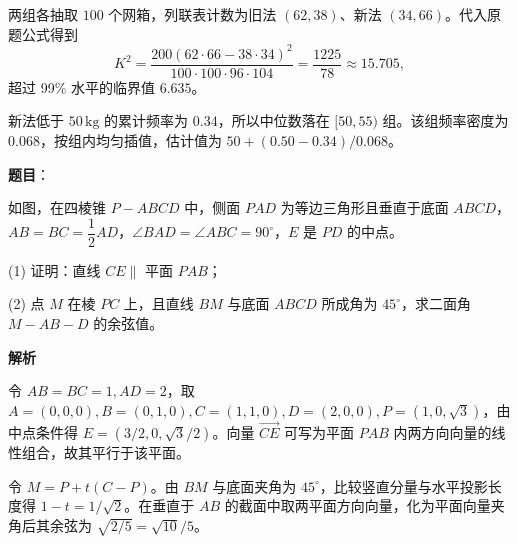 \begin{answer}
两组各抽取 \(100\) 个网箱，列联表计数为旧法 \((62,38)\)、新法 \((34,66)\)。代入原题公式得到
\nopagebreak[4]
\[
K^2=\frac{200(62\cdot66-38\cdot34)^2}{100\cdot100\cdot96\cdot104}=\frac{1225}{78}\approx15.705,
\]
超过 99\% 水平的临界值 \(6.635\)。


新法低于 \(50\,\mathrm{kg}\) 的累计频率为 \(0.34\)，所以中位数落在 \([50,55)\) 组。该组频率密度为 \(0.068\)，按组内均匀插值，估计值为 \(50+(0.50-0.34)/0.068\)。




\end{answer}
\begin{answer}

\textbf{题目}：

如图，在四棱锥 \(P-ABCD\) 中，侧面 \(PAD\) 为等边三角形且垂直于底面 \(ABCD\)，\(AB=BC=\dfrac{1}{2}AD\)，\(\angle BAD=\angle ABC=90^\circ\)，\(E\) 是 \(PD\) 的中点。
\nopagebreak[4]
\begin{center}\end{center}
\nopagebreak[4]
   (1) 证明：直线 \(CE\parallel\) 平面 \(PAB\)；

   (2) 点 \(M\) 在棱 \(PC\) 上，且直线 \(BM\) 与底面 \(ABCD\) 所成角为 \(45^\circ\)，求二面角 \(M-AB-D\) 的余弦值。

\textbf{解析}


令 \(AB=BC=1,AD=2\)，取 \(A=(0,0,0),B=(0,1,0),C=(1,1,0),D=(2,0,0),P=(1,0,\sqrt3)\)，由中点条件得 \(E=(3/2,0,\sqrt3/2)\)。向量 \(\overrightarrow{CE}\) 可写为平面 \(PAB\) 内两方向向量的线性组合，故其平行于该平面。


令 \(M=P+t(C-P)\)。由 \(BM\) 与底面夹角为 \(45^\circ\)，比较竖直分量与水平投影长度得 \(1-t=1/\sqrt2\)。在垂直于 \(AB\) 的截面中取两平面方向向量，化为平面向量夹角后其余弦为 \(\sqrt{2/5}=\sqrt{10}/5\)。



\end{answer}
